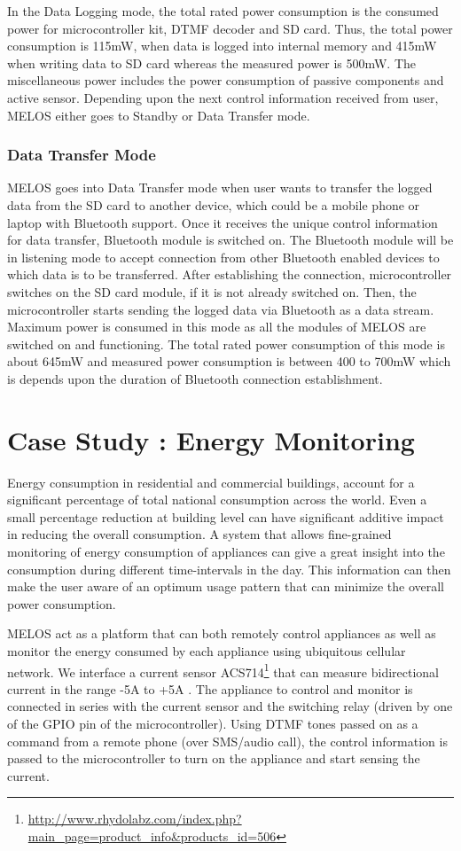\documentclass[10pt]{sigplan-proc-varsize}
\newcommand{\melos}{MELOS }
\begin{document}
In the Data Logging mode, the total rated power consumption is the consumed power for microcontroller kit, DTMF decoder and SD card. Thus, the total power consumption is 115mW, when data is logged into internal memory and 415mW when writing data to SD card whereas the measured power is 500mW. The miscellaneous power includes the power consumption of passive components and active sensor. Depending upon the next control information received from user, \melos either goes to Standby or Data Transfer mode.

\subsubsection{Data Transfer Mode}
\melos goes into Data Transfer mode when user wants to transfer the logged data from the SD card to another device, which could be a mobile phone or laptop with Bluetooth support. Once it receives the unique control information for data transfer, Bluetooth module is switched on. The Bluetooth module will be in listening mode to accept connection from other Bluetooth enabled devices to which data is to be transferred. After establishing the connection, microcontroller switches on the SD card module, if it is not already switched on. Then, the microcontroller starts sending the logged data via Bluetooth as a data stream. Maximum power is consumed in this mode as all the modules of \melos are switched on and functioning. The total rated power consumption of this mode is about 645mW and measured power consumption is between 400 to 700mW which is depends upon the duration of  Bluetooth connection establishment.

\section{Case Study : Energy Monitoring}
\label{sec:case}
Energy consumption in residential and commercial buildings, account for a significant percentage of total national consumption across the world.  Even a small percentage reduction at building level can have significant additive impact in reducing the overall consumption. A system that allows fine-grained monitoring of energy consumption of appliances can give a great insight into the consumption during different time-intervals in the day. This information can then make the user aware of an optimum usage pattern that
can minimize the overall power consumption.

\melos act as a platform that can both remotely control appliances as well as monitor the energy consumed by each appliance using ubiquitous cellular network. We interface a current sensor ACS714\footnote{\url{http://www.rhydolabz.com/index.php?main_page=product_info&products_id=506}} that can  measure bidirectional current in the range -5A to +5A . The appliance to control and monitor is connected in series with the current sensor and the switching relay (driven by one of the GPIO pin of the microcontroller). Using DTMF tones passed on as a command from a remote phone (over SMS/audio call), the control information is passed to the microcontroller to turn on the appliance and start sensing the current.
\end{document}
